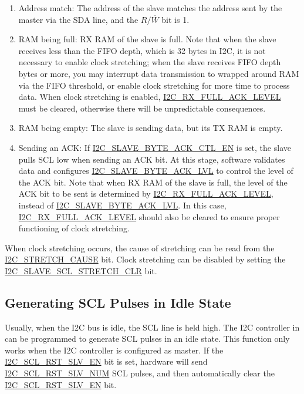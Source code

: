 \documentclass[main\_\_EN.tex]{subfiles}
\begin{document}
\begin{enumerate}
\item Address match: The address of the slave matches the address sent by the master via the SDA line, and the $R/\overline W$ bit is 1.
\item RAM being full: RX RAM of the slave is full. Note that when the slave receives less than the FIFO depth, which is 32 bytes in \chipname{} I2C, it is not necessary to enable clock stretching; when the slave receives FIFO depth bytes or more, you may interrupt data transmission to wrapped around RAM via the FIFO threshold, or enable clock stretching for more time to process data. When clock stretching is enabled, \hyperref[fielddesc:I2CRXFULLACKLEVEL]{I2C\_RX\_FULL\_ACK\_LEVEL} must be cleared, otherwise there will be unpredictable consequences.
\item RAM being empty: The slave is sending data, but its TX RAM is empty.
\item Sending an ACK: If \hyperref[fielddesc:I2CSLAVEBYTEACKCTLEN]{I2C\_SLAVE\_BYTE\_ACK\_CTL\_EN} is set, the slave pulls SCL low when sending an ACK bit. At this stage, software validates data and configures \hyperref[fielddesc:I2CSLAVEBYTEACKLVL]{I2C\_SLAVE\_BYTE\_ACK\_LVL} to control the level of the ACK bit. Note that when RX RAM of the slave is full, the level of the ACK bit to be sent is determined by \hyperref[fielddesc:I2CRXFULLACKLEVEL]{I2C\_RX\_FULL\_ACK\_LEVEL}, instead of \hyperref[fielddesc:I2CSLAVEBYTEACKLVL]{I2C\_SLAVE\_BYTE\_ACK\_LVL}. In this case, \hyperref[fielddesc:I2CRXFULLACKLEVEL]{I2C\_RX\_FULL\_ACK\_LEVEL} should also be cleared to ensure proper functioning of clock stretching.
\end{enumerate}

When clock stretching occurs, the cause of stretching can be read from the \hyperref[fielddesc:I2CSTRETCHCAUSE]{I2C\_STRETCH\_CAUSE} bit. Clock stretching can be disabled by setting the \hyperref[fielddesc:I2CSLAVESCLSTRETCHCLR]{I2C\_SLAVE\_SCL\_STRETCH\_CLR} bit.

\subsection{Generating SCL Pulses in Idle State}
Usually, when the I2C bus is idle, the SCL line is held high. The I2C controller in \chipname{} can be programmed to generate SCL pulses in an idle state. This function only works when the I2C controller is configured as master. If the \hyperref[fielddesc:I2CSCLRSTSLVEN]{I2C\_SCL\_RST\_SLV\_EN} bit is set, hardware will send \hyperref[fielddesc:I2CSCLRSTSLVNUM]{I2C\_SCL\_RST\_SLV\_NUM} SCL pulses, and then automatically clear the \hyperref[fielddesc:I2CSCLRSTSLVEN]{I2C\_SCL\_RST\_SLV\_EN} bit.
\end{document}
